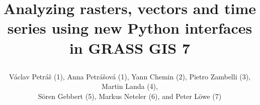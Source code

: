 \documentclass[innermargin=10mm]{tikzposter}
\title{
  \begin{minipage}{\textwidth}
    \centering
    Analyzing rasters, vectors and time series using new Python interfaces in GRASS GIS 7
  \end{minipage}
}
\author{
V\'{a}clav Petr\'{a}\v{s} (1), Anna Petr\'{a}\v{s}ov\'{a} (1), Yann Chemin (2), Pietro Zambelli (3), Martin Landa (4), \\
S\"{o}ren Gebbert (5), Markus Neteler (6), and Peter L\"{o}we (7)
}
\institute{
\large  %
(1) North Carolina State University, Raleigh, USA (wenzeslaus@gmail.com, vpetras@ncsu.edu), (2) International Water Management Institute,
Pelawatta, Sri Lanka, (3) EURAC Research, Institute for Renewable Energy, Bolzano/Bozen, Italy, (4) Faculty of Civil
Engineering, Czech Technical University in Prague, Czech Republic, (5) Th\"{u}nen Institute of Climate-Smart Agriculture,
Braunschweig, Germany, (6) Research and Innovation Centre, Fondazione Edmund Mach, San Michele all'Adige, Italy, (7)
German National Library for Science and Technology, Hanover, Germany
}
\begin{document}
\maketitle[width=0.95\textwidth]



\begin{columns}


%
% 
%
% 


\end{columns}
\end{document}
